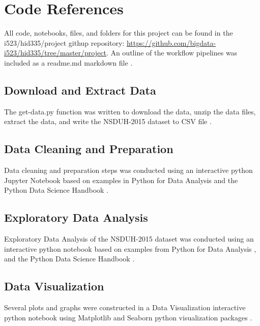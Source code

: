 \documentclass[sigconf]{acmart}
\begin{document}
\section{Code References}
All code, notebooks, files, and folders for this project can be found in the
i523/hid335/project githup repository: 
\url{https://github.com/bigdata-i523/hid335/tree/master/project}.
An outline of the workflow pipelines was included as a readme.md markdown
file \cite{pipeline17}.

\subsection{Download and Extract Data}

The get-data.py function was written to download the data, unzip the data
files, extract the data, and write the NSDUH-2015 dataset to CSV file 
\cite{getdata17}.

\subsection{Data Cleaning and Preparation}

Data cleaning and preparation steps was conducted using an interactive python 
Jupyter Notebook \cite{data17} based on examples in Python for Data Analysis 
\cite{mckinney17} and the Python Data Science Handbook \cite{vanderplas17}.

\subsection{Exploratory Data Analysis}

Exploratory Data Analysis of the NSDUH-2015 dataset was conducted using an 
interactive python notebook \cite{eda17} based on examples from Python for 
Data Analysis \cite{mckinney17}, and the Python Data Science Handbook 
\cite{vanderplas17}.  

\subsection{Data Visualization}

Several plots and graphs were constructed in a Data Visualization interactive
python notebook \cite{dataviz17} using Matplotlib and Seaborn python 
visualization packages \cite{mckinney17, vanderplas17}.  
\end{document}
